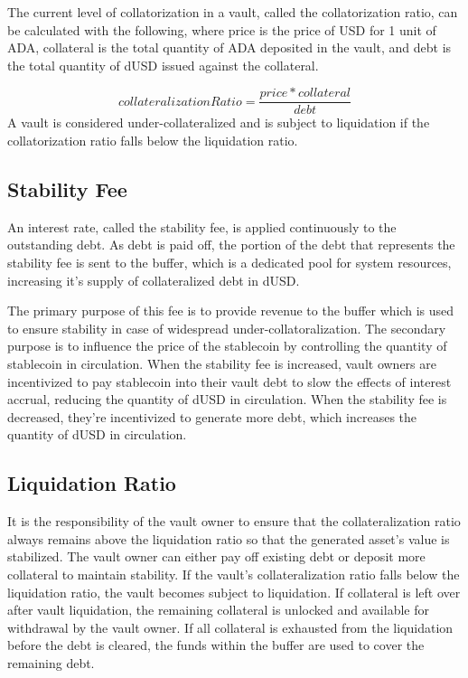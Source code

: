 \documentclass[12pt]{article}
\begin{document}
The current level of collatorization in a vault, called the collatorization ratio, can be calculated with the following, where price is the price of USD for 1 unit of ADA, collateral is the total quantity of ADA deposited in the vault, and debt is the total quantity of dUSD issued against the collateral.

\begin{equation*}
	collateralizationRatio = \frac{price * collateral}{debt}
\end{equation*}
A vault is considered under-collateralized and is subject to liquidation if the collatorization ratio falls below the liquidation ratio.

\subsection{Stability Fee}

An interest rate, called the stability fee, is applied continuously to the outstanding debt. As debt is paid off, the portion of the debt that represents the stability fee is sent to the buffer, which is a dedicated pool for system resources, increasing it's supply of collateralized debt in dUSD.

The primary purpose of this fee is to provide revenue to the buffer which is used to ensure stability in case of widespread under-collatoralization. The secondary purpose is to influence the price of the stablecoin by controlling the quantity of stablecoin in circulation. When the stability fee is increased, vault owners are incentivized to pay stablecoin into their vault debt to slow the effects of interest accrual, reducing the quantity of dUSD in circulation. When the stability fee is decreased, they're incentivized to generate more debt, which increases the quantity of dUSD in circulation.

\subsection{Liquidation Ratio}

It is the responsibility of the vault owner to ensure that the collateralization ratio always remains above the liquidation ratio so that the generated asset's value is stabilized. The vault owner can either pay off existing debt or deposit more collateral to maintain stability. If the vault's collateralization ratio falls below the liquidation ratio, the vault becomes subject to liquidation. If collateral is left over after vault liquidation, the remaining collateral is unlocked and available for withdrawal by the vault owner. If all collateral is exhausted from the liquidation before the debt is cleared, the funds within the buffer are used to cover the remaining debt.
\end{document}
